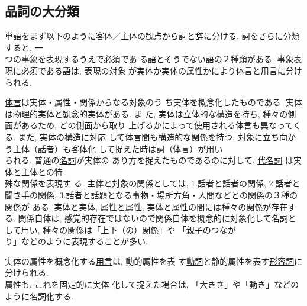 \subsection{品詞の大分類}

単語をまず以下のように客体／主体の観点から\underline{詞}と\underline
{辞}に分ける. 詞をさらに分類すると, 一\\つの事象を表現するうえで必須であ
る語とそうでない語の２種類がある. 事象表現に必須である語は, 表現の対象
が実体か実体の属性かにより体言と用言に分けられる.

\underline{体言}は実体・属性・関係からなる対象のう
ち実体を概念化したものである. 実体は物理的実体と観念的実体がある. ま
た, 実体は立体的な構造を持ち, 種々の側面があるため, どの側面から取り
上げるかによって使用される体言も異なってくる. また, 実体の構造に対応
して体言間も構造的な関係を持つ. \hspace*{0.4mm}対象に立ち向かう主体\hspace*{0.2mm}（話者）も客体化
して捉えた時は詞\hspace*{0.2mm}（体言）が用い\\られる. \hspace*{-0.2mm}普通の\hspace*{-0.2mm}\underline{名詞}が実体の
あり方を捉えたものであるのに対して, \hspace*{-0.2mm}\underline{代名詞}
は実体と主体との特\\殊な関係を表現す
る. \hspace*{-0.2mm}主体と対象の関係としては, \hspace*{-0.1mm}1.話者と話者の関係, \hspace*{-0.1mm}2.話者と聞き手の関係,
3.話者と話題となる事物・場所方角・人間などとの関係の３種の関係が
ある. 実体と実体, 属性と属性, 実体と属性の間には種々の関係が存在する. 
関係自体は, 感覚的存在ではないので関係自体を概念的に対象化して名詞と
して用い, 種々の関係は「\underline{上下}（の）関係」や
「\underline{親子}のつなが\\り」などのように表現することが多い. 

 実体の属性を概念化する\hspace*{-0.2mm}\underline{用言}\hspace*{-0.1mm}は, 動的属性を表
す\hspace*{-0.2mm}\underline{動詞}\hspace*{-0.1mm}と静的属性を表す\hspace*{-0.2mm}\underline{形容詞}\hspace*{-0.1mm}に分けられる.\\ 
属性も, これを固定的に実体
化して捉えた場合は, 「大きさ」や「動き」などのように名詞化する. 


